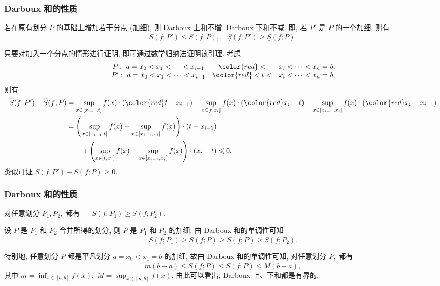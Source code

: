 \begin{frame}
\frametitle{Darboux 和的性质}

\begin{lem}
若在原有划分 $P$ 的基础上增加若干分点 (加细), 则 Darboux 上和不增, Darboux 下和不减. 即, 若 $P'$ 是 $P$ 的一个加细, 则有
\[\overline{S}(f; P') \leqslant \overline{S}(f; P), \quad \underline{S}(f; P') \geqslant \underline{S}(f; P).\]
\end{lem}

\pause

只要对加入一个分点的情形进行证明, 即可通过数学归纳法证明该引理. 考虑
\[
\begin{array}{ccc}
P: ~ a = x_0 < x_1 < \cdots < x_{i-1} & {\color{red} <} & x_i < \cdots < x_n = b, \\
P': ~ a = x_0 < x_1 < \cdots < x_{i-1} & {\color{red} < t <} & x_i < \cdots < x_n = b,
\end{array}
\]
则有
\begin{align*}
\overline{S}(f; P') - \overline{S}(f; P) & = \sup_{x \in [x_{i-1}, t]} f(x) \cdot ({\color{red} t - x_{i-1}}) + \sup_{x \in [t, x_i]} f(x) \cdot ({\color{red} x_i - t}) - \sup_{x \in [x_{i-1}, x_i]} f(x) \cdot ({\color{red} x_i - x_{i-1}}) \\
& = \left(\sup_{x \in [x_{i-1}, t]} f(x) - \sup_{x \in [x_{i-1}, x_i]} f(x)\right) \cdot (t - x_{i-1}) \\
& \hspace{2em} + \left(\sup_{x \in [t, x_i]} f(x) - \sup_{x \in [x_{i-1}, x_i]} f(x)\right) \cdot (x_i - t) \leqslant 0.
\end{align*}
类似可证 $\underline{S}(f; P') - \underline{S}(f; P) \geqslant 0.$

\end{frame}


\begin{frame}
\frametitle{Darboux 和的性质}

\begin{cor}
对任意划分 $P_1, P_2,$ 都有 ~~ $\overline{S}(f; P_1) \geqslant \underline{S}(f; P_2).$
\end{cor}

\pause
\vspace{1em}

设 $P$ 是 $P_1$ 和 $P_2$ 合并所得的划分, 则 $P$ 是 $P_1$ 和 $P_2$ 的加细, 由 Darboux 和的单调性可知
\[\overline{S}(f; P_1) \geqslant \overline{S}(f; P) \geqslant \underline{S}(f; P) \geqslant \underline{S}(f; P_2).\]

\pause
\vspace{1em}

\begin{cor}
特别地, 任意划分 $P$ 都是平凡划分 $a = x_0 < x_1 = b$ 的加细, 故由 Darboux 和的单调性可知, 对任意划分 $P,$ 都有
\[
m(b-a) \leqslant \underline{S}(f; P) \leqslant \overline{S}(f; P) \leqslant M(b-a),
\]
其中 $m = \inf_{x \in [a,b]} f(x),$ $M = \sup_{x \in [a,b]} f(x).$ 由此可以看出, Darboux 上、下和都是有界的.
\end{cor}

\end{frame}

